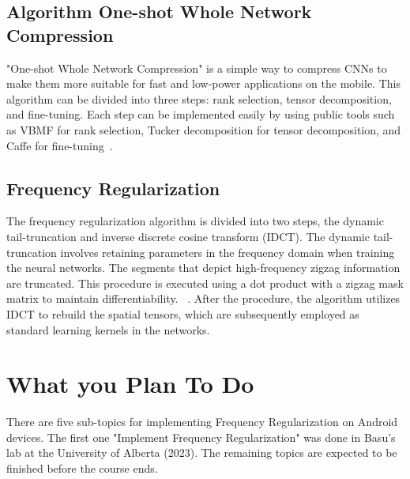 \documentclass{article}
\begin{document}
\subsection{Algorithm One-shot Whole Network Compression}\label{oneshot}
"One-shot Whole Network Compression" is a simple way to compress CNNs to make them more suitable for fast and low-power applications on the mobile. This algorithm can be divided into three steps: rank selection, tensor decomposition, and fine-tuning. Each step can be implemented easily by using public tools such as VBMF for rank selection, Tucker decomposition for tensor decomposition, and Caffe for fine-tuning~\cite{kim2016compression}.

\subsection{Frequency Regularization}\label{fr}
The frequency regularization algorithm is divided into two steps, the dynamic tail-truncation and inverse discrete cosine transform (IDCT). The dynamic tail-truncation involves retaining parameters in the frequency domain when training the neural networks. The segments that depict high-frequency zigzag information are truncated. This procedure is executed using a dot product with a zigzag mask matrix to maintain differentiability. ~\cite{zhao2023frequency}. After the procedure, the algorithm utilizes IDCT to rebuild the spatial tensors, which are subsequently employed as standard learning kernels in the networks.


\section*{What you Plan To Do}
There are five sub-topics for implementing Frequency Regularization on Android devices. The first one "Implement Frequency Regularization" was done in Basu's lab at the University of Alberta (2023). The remaining topics are expected to be finished before the course ends.
\end{document}
